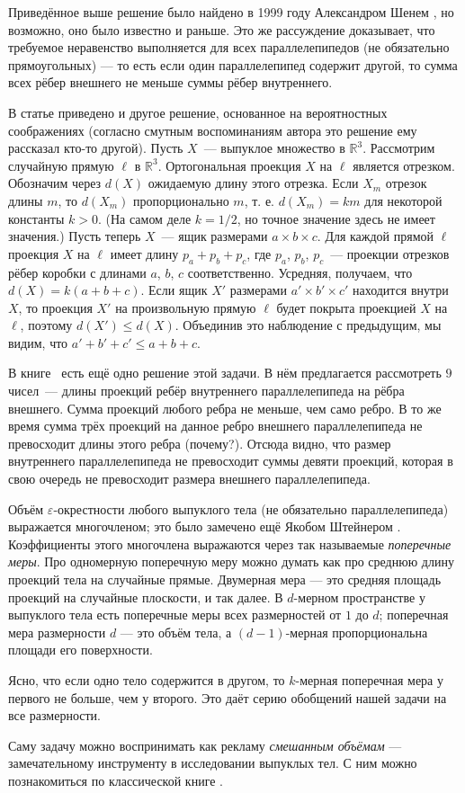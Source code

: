 \begin{addedbytheeditors}
Приведённое выше решение было найдено в 1999 году Александром Шенем \cite{shen}, но возможно, оно было известно и раньше.
Это же рассуждение доказывает, что требуемое неравенство выполняется для всех параллелепипедов (не обязательно прямоугольных) --- то есть если один параллелепипед содержит другой, то сумма всех рёбер внешнего не меньше суммы рёбер внутреннего.

В статье \cite{shen}  приведено и другое решение, основанное на вероятностных соображениях (согласно смутным
воспоминаниям автора это решение ему рассказал кто-то другой). Пусть $X$~---  выпуклое множество в $\mathbb{R}^3$. Рассмотрим
случайную прямую $\ell$ в $\mathbb{R}^3$. Ортогональная проекция $X$ на $\ell$ является отрезком. Обозначим через $d(X)$ ожидаемую
длину этого отрезка. Если $X_m$ отрезок длины $m$, то $d(X_m)$ пропорционально $m$, т. е.
$d(X_m) =km$ для некоторой константы $k>0$. (На самом деле $k =1/2$, но точное значение здесь не имеет значения.) Пусть теперь $X$~--- ящик размерами $a\times b\times c$. Для каждой прямой $\ell$ проекция $X$ на $\ell$ имеет длину $p_a + p_b+p_c$, где
$p_a$, $p_b$, $p_c$~---  проекции отрезков рёбер коробки с длинами $a$, $b$, $c$ соответственно. Усредняя, получаем, что
$d(X) = k(a + b + c).$
Если ящик $X'$ размерами $a'\times b'\times c'$ находится внутри $X$, то проекция $X'$ на
произвольную прямую $\ell$ будет покрыта проекцией
$X$ на $\ell$, поэтому $d(X')\le d(X)$. Объединив это наблюдение с предыдущим, мы видим, что
$a'+b'+c'\le a+b+c.$ 

В книге~\cite{Tolpzgo2010} есть ещё одно решение этой задачи. В нём предлагается рассмотреть $9$ чисел~--- длины проекций ребёр внутреннего параллелепипеда на рёбра внешнего. Сумма проекций любого ребра не меньше, чем само ребро. В то же время сумма трёх проекций на данное ребро внешнего параллелепипеда не превосходит длины этого ребра (почему?). Отсюда видно, что размер внутреннего параллелепипеда не превосходит суммы девяти проекций, которая в свою очередь не превосходит размера внешнего параллелепипеда.

Объём $\varepsilon$-окрестности любого выпуклого тела (не обязательно параллелепипеда) выражается многочленом; это было замечено ещё Якобом Штейнером \cite{steiner}.
Коэффициенты этого многочлена выражаются через так называемые \emph{поперечные меры}.
Про одномерную поперечную меру можно думать как про среднюю длину проекций тела на случайные прямые.
Двумерная мера --- это средняя площадь проекций на случайные плоскости, и так далее.
В $d$-мерном пространстве у выпуклого тела есть поперечные меры всех размерностей от $1$ до $d$;
поперечная мера размерности $d$ --- это объём тела, а $(d-1)$-мерная пропорциональна площади его поверхности.

Ясно, что если одно тело содержится в другом, то $k$-мерная поперечная мера у первого не больше, чем у второго.
Это даёт серию обобщений нашей задачи на все размерности.

Саму задачу можно воспринимать как рекламу \emph{смешанным объёмам} --- замечательному инструменту в исследовании выпуклых тел.
С ним можно познакомиться по классической книге \cite{burago-zalgaller}.\pr
\end{addedbytheeditors}
